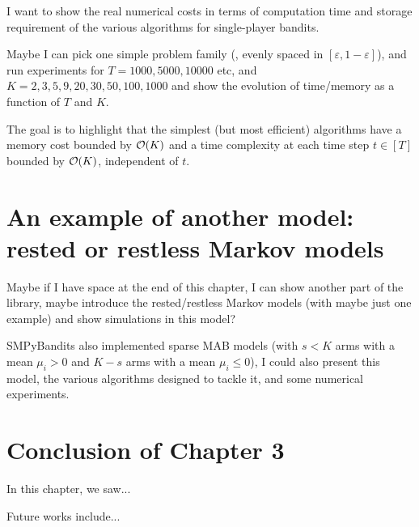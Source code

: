 I want to show the real numerical costs in terms of computation time and storage requirement of the various algorithms for single-player bandits.

Maybe I can pick one simple problem family (\eg, evenly spaced in $[\varepsilon,1-\varepsilon]$), and run experiments for $T=1000,5000,10000$ etc, and $K=2,3,5,9,20,30,50,100,1000$ and show the evolution of time/memory as a function of $T$ and $K$.

The goal is to highlight that the simplest (but most efficient) algorithms have a memory cost bounded by $\mathop{}\mathopen{}\mathcal{O}\mathopen{}\left(K\right)$ and a time complexity at each time step $t\in[T]$ bounded by $\mathop{}\mathopen{}\mathcal{O}\mathopen{}\left(K\right)$, independent of $t$.


\section{An example of another model: rested or restless Markov models}
\label{sec:3:markovModels}

Maybe if I have space at the end of this chapter, I can show another part of the library, maybe introduce the rested/restless Markov models (with maybe just one example) and show simulations in this model?

SMPyBandits also implemented sparse MAB models (with $s<K$ arms with a mean $\mu_i>0$ and $K-s$ arms with a mean $\mu_i \leq 0$), I could also present this model, the various algorithms designed to tackle it, and some numerical experiments.


\section{Conclusion of Chapter 3}
\label{sec:3:conclusion}

In this chapter, we saw...

Future works include...


